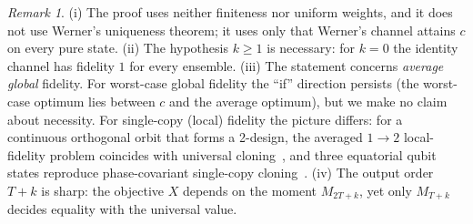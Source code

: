 \documentclass[11pt]{article}
\theoremstyle{definition}
\theoremstyle{remark}
\newtheorem{remark}[theorem]{Remark}
\begin{document}
\begin{remark}\label{rem:scope}
(i) The proof uses neither finiteness nor uniform weights, and it does not use Werner's uniqueness theorem; it uses
only that Werner's channel attains $c$ on every pure state. (ii) The hypothesis $k\ge1$ is necessary: for $k=0$ the
identity channel has fidelity $1$ for every ensemble. (iii) The statement concerns \emph{average global} fidelity.
For worst-case global fidelity the ``if'' direction persists (the worst-case optimum lies between $c$ and the average
optimum), but we make no claim about necessity. For single-copy (local) fidelity the picture differs: for a
continuous orthogonal orbit that forms a 2-design, the averaged $1\to2$ local-fidelity problem coincides with
universal cloning~\cite{CwiklinskiStudzinski2026}, and three equatorial qubit states reproduce phase-covariant
single-copy cloning~\cite{Jing2012}. (iv) The output order $T+k$ is sharp: the
objective $X$ depends on the moment $M_{2T+k}$, yet only $M_{T+k}$ decides equality with the universal value.
\end{remark}
\end{document}
